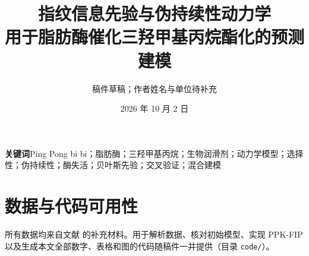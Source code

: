 \documentclass[10pt]{article}
\title{指纹信息先验与伪持续性动力学\\用于脂肪酶催化三羟甲基丙烷酯化的预测建模}
\author{稿件草稿；作者姓名与单位待补充}
\date{2026 年 10 月 2 日}
\begin{document}
\maketitle
\begin{abstract}\end{abstract}
\noindent\textbf{关键词}\quad Ping Pong bi bi；脂肪酶；三羟甲基丙烷；生物润滑剂；动力学模型；选择性；伪持续性；酶失活；贝叶斯先验；交叉验证；混合建模





\section*{数据与代码可用性}
所有数据均来自文献 \cite{nishimura2026} 的补充材料。用于解析数据、核对初始模型、实现 PPK-FIP 以及生成本文全部数字、表格和图的代码随稿件一并提供（目录 \texttt{code/}）。


\end{document}
